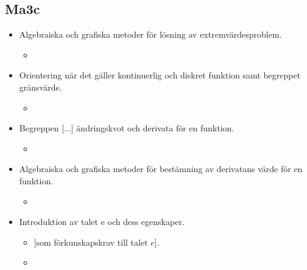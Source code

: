 \subsection*{Ma3c}
\begin{itemize}
\item Algebraiska och grafiska metoder för lösning av extremvärdesproblem.
	\begin{itemize}
	\item {} 
	\end{itemize}
\item Orientering när det gäller kontinuerlig och diskret funktion samt begreppet gränsvärde.
	\begin{itemize}
	\item {} 
	\end{itemize}
\item Begreppen [...] ändringskvot och derivata för en funktion.
	\begin{itemize}
	\item {} 
	\end{itemize}
\item Algebraiska och grafiska metoder för bestämning av derivatans värde för en funktion.
	\begin{itemize}
	\item {} 
	\end{itemize}
\item Introduktion av talet e och dess egenskaper.
	\begin{itemize}
	\item {} {\color{myBlue}[som förkunskapskrav till talet $e$].}
	\item {} 
	\end{itemize}
\end{itemize}
